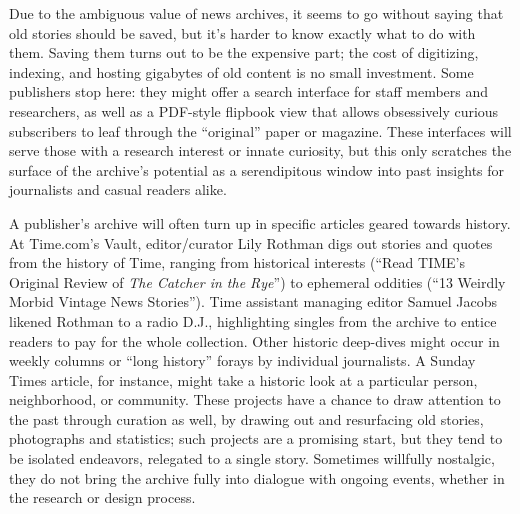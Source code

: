 Due to the ambiguous value of news archives, it seems to go without saying that old stories should be saved, but it's harder to know exactly what to do with them. Saving them turns out to be the expensive part; the cost of digitizing, indexing, and hosting gigabytes of old content is no small investment. Some publishers stop here: they might offer a search interface for staff members and researchers, as well as a PDF-style flipbook view that allows obsessively curious subscribers to leaf through the ``original'' paper or magazine. These interfaces will serve those with a research interest or innate curiosity, but this only scratches the surface of the archive's potential as a serendipitous window into past insights for journalists and casual readers alike.

A publisher's archive will often turn up in specific articles geared towards history. At Time.com's Vault, editor/curator Lily Rothman digs out stories and quotes from the history of Time, ranging from historical interests (``Read TIME's Original Review of \emph{The Catcher in the Rye}'') to ephemeral oddities (``13 Weirdly Morbid Vintage News Stories''). Time assistant managing editor Samuel Jacobs likened Rothman to a radio D.J., highlighting singles from the archive to entice readers to pay for the whole collection.\autocite{levy_time.com_2014} Other historic deep-dives might occur in weekly columns or ``long history'' forays by individual journalists. A Sunday Times article, for instance, might take a historic look at a particular person, neighborhood, or community. These projects have a chance to draw attention to the past through curation as well, by drawing out and resurfacing old stories, photographs and statistics; such projects are a promising start, but they tend to be isolated endeavors, relegated to a single story. Sometimes willfully nostalgic, they do not bring the archive fully into dialogue with ongoing events, whether in the research or design process.


